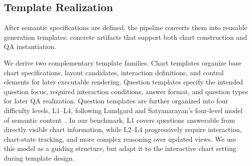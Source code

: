 \documentclass[review,journal,hideappendix]{vgtc} %
\newcommand{\placeholder}[1]{\textcolor{red}{\textbf{[Placeholder: #1]}}}
\begin{document}
\subsection{Template Realization}

After semantic specifications are defined, the pipeline converts them into reusable generation templates: concrete artifacts that support both chart construction and QA instantiation.

We derive two complementary template families. Chart templates organize base chart specifications, layout candidates, interaction definitions, and control elements for later executable rendering. Question templates specify the intended question focus, required interaction conditions, answer format, and question types for later QA realization. 
Question templates are further organized into four difficulty levels, L1--L4, following Lundgard and Satyanarayan's four-level model of semantic content~\cite{lundgardAccessibleVisualizationNatural2022}. In our benchmark, L1 covers questions answerable from directly visible chart information, while L2--L4 progressively require interaction, chart-state tracking, and more complex reasoning over updated views. We use this model as a guiding structure, but adapt it to the interactive chart setting during template design.
\end{document}
